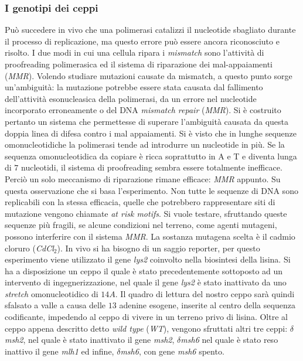 	\subsubsection*{I genotipi dei ceppi}
	Può succedere in vivo che una polimerasi catalizzi il nucleotide sbagliato durante il processo di replicazione, ma questo errore può essere ancora riconosciuto e risolto. 
	I due modi in cui una cellula ripara i \emph{mismatch} sono l'attività di proofreading polimerasica ed il sistema di riparazione dei mal-appaiamenti (\emph{MMR}). 
	Volendo studiare mutazioni causate da mismatch, a questo punto sorge un'ambiguità: la mutazione potrebbe essere stata causata dal fallimento dell'attività esonucleasica della polimerasi, da un errore nel nucleotide incorporato erroneamente o del DNA \emph{mismatch repair} (\emph{MMR}). 
	Si è costruito pertanto un sistema che permettesse di superare l'ambiguità causata da questa doppia linea di difesa contro i mal appaiamenti. 
	Si è visto che in lunghe sequenze omonucleotidiche la polimerasi tende ad introdurre un nucleotide in più. 
	Se la sequenza omonucleotidica da copiare è ricca soprattutto in A e T e diventa lunga di $7$ nucleotidi, il sistema di proofreading sembra essere totalmente inefficace. 
	Perci\`o un solo meccanismo di riparazione rimane efficace: \emph{MMR} appunto.
	Su questa osservazione che si basa l'esperimento. 
	Non tutte le sequenze di DNA sono replicabili con la stessa efficacia, quelle che potrebbero rappresentare siti di mutazione vengono chiamate \emph{at risk motifs}. 
	Si vuole testare, sfruttando queste sequenze più fragili, se alcune condizioni nel terreno, come agenti mutageni, possono interferire con il sistema \emph{MMR}. 
	La sostanza mutagena scelta è il cadmio cloruro (\emph{CdCl$_{2}$}). 
	In vivo si ha bisogno di un saggio reporter, per questo esperimento viene utilizzato il gene \emph{lys2} coinvolto nella biosintesi della lisina. 
	Si ha a disposizione un ceppo il quale è stato precedentemente sottoposto ad un intervento di ingegnerizzazione, nel quale il gene \emph{lys2} è stato inattivato da uno \emph{stretch} omonucleotidico di $14 A$. 
	Il quadro di lettura del nostro ceppo sarà quindi sfalsato a valle a causa delle $13$ adenine esogene, inserite al centro della sequenza codificante, impedendo al ceppo di vivere in un terreno privo di lisina. 
	Oltre al ceppo appena descritto detto \emph{wild type} (\emph{WT}), vengono sfruttati altri tre ceppi: \emph{$\delta$msh2}, nel quale è stato inattivato il gene \emph{msh2}, \emph{$\delta$msh6} nel quale è stato reso inattivo il gene \emph{mlh1} ed infine, \emph{$\delta$msh6}, con gene \emph{msh6} spento. 

